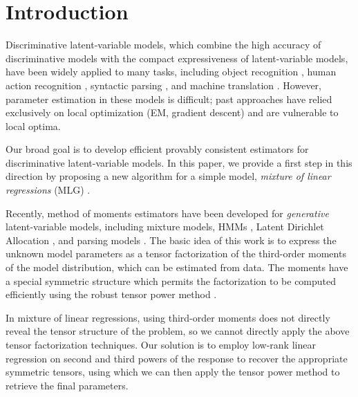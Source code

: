 \section{Introduction}
\label{sec:intro}

Discriminative latent-variable models,
which combine the high accuracy of discriminative models
with the compact expressiveness of latent-variable models,
have been widely applied to many tasks, including
object recognition \cite{quattoni04crf},
human action recognition \cite{wang09crf},
syntactic parsing \cite{petrov08discriminative},
and machine translation \cite{liang06discrimative}.
However, parameter estimation in these models is difficult;
past approaches have relied exclusively on local optimization (EM, 
gradient descent) and are vulnerable to local optima.

Our broad goal is to develop efficient provably consistent estimators for
discriminative latent-variable models.
In this paper, we provide a first step in this 
direction by proposing a new algorithm for a simple model,
\emph{mixture of linear regressions} (MLG) \cite{VieleTong2002}.

Recently, method of moments estimators have been developed for
\emph{generative} latent-variable models, including
mixture models, HMMs \cite{AnandkumarHsuKakade2012},
Latent Dirichlet Allocation \cite{anandkumar12lda},
and parsing models \cite{hsu12identifiability}.
The basic idea of this work is to express
the unknown model parameters as a tensor factorization
of the third-order moments of the model distribution, which
can be estimated from data.
The moments have a special symmetric structure
which permits the factorization to be computed efficiently using the robust
tensor power method \cite{AnandkumarGeHsu2012}.

In mixture of linear regressions, using third-order moments does not
directly reveal the tensor structure of the problem, so we cannot
directly apply the above tensor factorization techniques.  Our solution
is to employ low-rank linear regression
\cite{NegahbanWainwright2009,Tomioka2011} on second and third powers of
the response to recover the appropriate symmetric tensors, using which we
can then apply the tensor power method to retrieve the final parameters.

